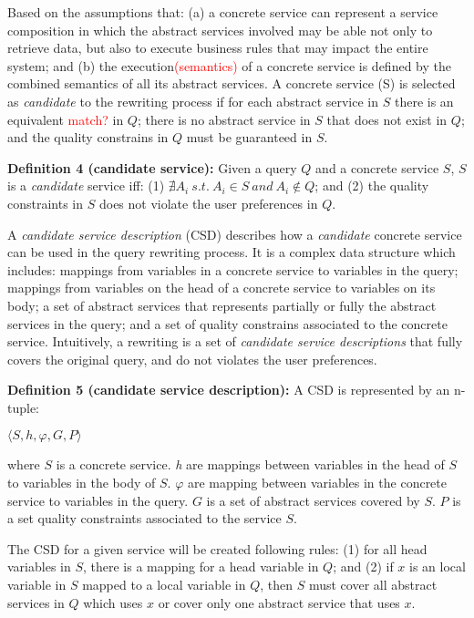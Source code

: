 
Based on the assumptions that: (a) a concrete service can represent a service composition in which the abstract services involved may be able not only to retrieve data, but also to execute business rules that may impact the entire system; and (b) the execution\textcolor{red}{(semantics)} of a concrete service is defined by the combined semantics of all its abstract services.  
A concrete service (S) is selected as \textit{candidate} to the rewriting process if for each abstract service in $S$ there is an equivalent \textcolor{red}{match?} in $Q$; there is no abstract service in $S$ that does not exist in $Q$; and the quality constrains in $Q$ must be guaranteed in $S$.

\noindent \textbf{Definition 4 (candidate service):} Given a query $Q$ and a concrete service $S$, $S$ is a \textit{candidate} service iff: (1) $\nexists A_{i} \ s.t. \ A_{i} \in S \ and \ A_{i} \not\in Q$; and (2) the quality constraints in $S$ does not violate the user preferences in $Q$. 



A \textit{candidate service description} (CSD) describes how a \textit{candidate} concrete service can be used in the query rewriting process.
It is a complex data structure which includes: mappings from variables in a concrete service to variables in the query; 
mappings from variables on the head of a concrete service to variables on its body;
a set of abstract services that represents partially or fully the abstract services in the query; and 
a set of quality constrains associated to the concrete service.
Intuitively, a rewriting is a set of \textit{candidate service descriptions} that fully covers the original query, and do not violates the user preferences.

\noindent \textbf{Definition 5 (candidate service description):} A CSD is represented by an n-tuple: %
\begin{center}
$\langle S, h, \varphi, G, P\rangle$
\end{center}
where $S$ is a concrete service. 
\textit{h} are mappings between variables in the head of $S$ to variables in the body of $S$. 
$\varphi$ are mapping between variables in the concrete service to variables in the query.
$G$ is a set of abstract services covered by $S$. 
$P$ is a set quality constraints associated to the service $S$. 

The CSD for a given service will be created following rules: (1) for all head variables in $S$, there is a mapping for a head variable in $Q$; and (2) if $x$ is an local variable in $S$ mapped to a local variable in $Q$, then $S$ must cover all abstract services in $Q$ which uses $x$ or cover only one abstract service that uses $x$.
